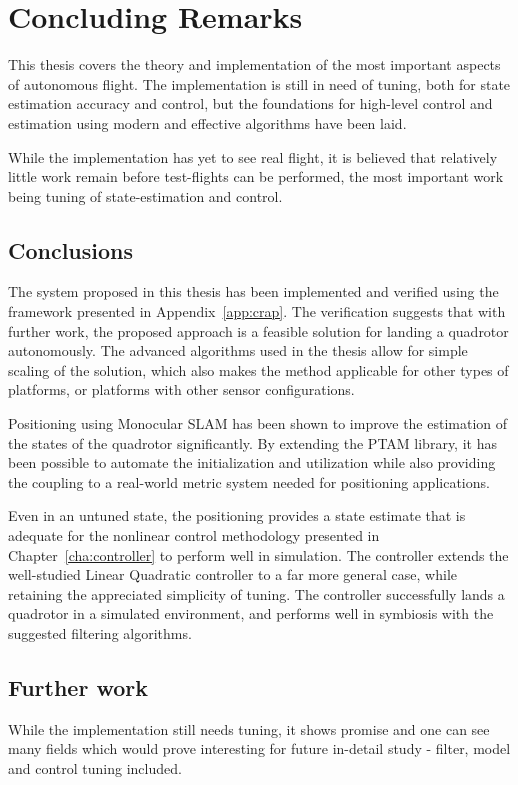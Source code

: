 \chapter{Concluding Remarks}
\label{cha:conclusions}
    This thesis covers the theory and implementation of the most
    important aspects of autonomous flight. The implementation is
    still in need of tuning, both for state estimation accuracy and control,
    but the foundations for high-level control and estimation using
    modern and effective algorithms have been laid.

    While the implementation has yet to see real flight, it is believed
    that relatively little work remain before test-flights can be performed,
    the most important work being tuning of state-estimation and control.

\section{Conclusions}
    The system proposed in this thesis has been implemented and verified
    using the framework presented in Appendix~\ref{app:crap}.
    The verification suggests that with further work, the proposed approach
    is a feasible solution for landing a quadrotor autonomously.
    The advanced algorithms used in the thesis allow for
    simple scaling of the solution, which also makes the method applicable
    for other types of platforms, or platforms with other sensor configurations.

    Positioning using Monocular SLAM has been shown to improve the estimation of the states
    of the quadrotor significantly. By extending the PTAM library,
    it has been possible to automate the initialization and utilization
    while also providing the coupling to a real-world metric system needed
    for positioning applications.

    Even in an untuned state, the positioning provides a state estimate
    that is adequate for the nonlinear control methodology presented
    in Chapter~\ref{cha:controller} to perform well in simulation.
    The controller extends the well-studied Linear Quadratic controller
    to a far more general case, while retaining the appreciated simplicity of tuning.
    The controller successfully lands a quadrotor in a simulated environment,
    and performs well in symbiosis with the suggested filtering algorithms.


\section{Further work}
\label{sec:conclusions:furtherwork}
    While the implementation still needs tuning, it shows promise
    and one can see many fields which would prove interesting for
    future in-detail study - filter, model and control tuning included.

